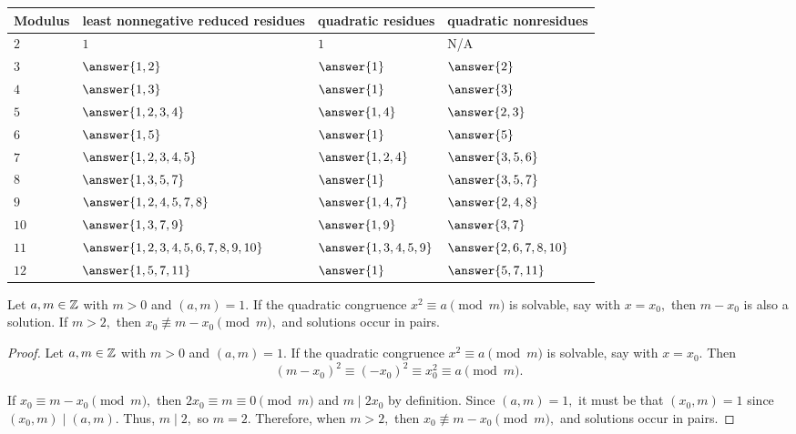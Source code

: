 \documentclass[letterpaper, 11 pt]{ximera}
\theoremstyle{definition}
\begin{document}
\begin{br}
\begin{solution}
        \begin{tabular}{p{1.5cm}|p{4cm}p{3cm}p{3cm}}
            Modulus & least nonnegative reduced residues & quadratic residues & quadratic nonresidues \\\hline
            $2$ & $1$   
                & $1$ 
                & N/A \\
            $3$ & $\answer{1,2}$ 
                & $\answer{1}$
                & $\answer{2}$\\
            $4$ & $\answer{1,3}$ 
                & $\answer{1}$
                & $\answer{3}$\\
            $5$ & $\answer{1,2,3,4}$
                & $\answer{1,4}$
                & $\answer{2,3}$\\
            $6$ & $\answer{1,5}$
                & $\answer{1}$
                & $\answer{5}$\\
            $7$ & $\answer{1,2,3,4,5}$
                & $\answer{1,2,4}$
                & $\answer{3,5,6}$\\
            $8$ & $\answer{1,3,5,7}$
                & $\answer{1}$
                & $\answer{3,5,7}$\\
            $9$ & $\answer{1,2,4,5,7,8}$
                & $\answer{1,4,7}$
                & $\answer{2,4,8}$\\
            $10$ & $\answer{1,3,7,9}$
                & $\answer{1,9}$
                & $\answer{3,7}$\\
            $11$ & $\answer{1,2,3,4,5,6,7,8,9,10}$
                & $\answer{1,3,4,5,9}$
                & $\answer{2,6,7,8,10}$\\
            $12$ & $\answer{1,5,7,11}$
                & $\answer{1}$
                & $\answer{5,7,11}$\\
        \end{tabular}
    \end{solution}
\end{br}

\begin{lem*}\label{lem:roots-pairs}
    Let $a,m\in\mathbb Z$ with $m>0$ and $(a,m)=1.$ If the quadratic congruence $x^2\equiv a\pmod{m}$ is solvable, say with $x=x_0,$ then  $m-x_0$ is also a solution. If $m\gt 2,$ then $x_0\not\equiv m-x_0\pmod{m},$ and solutions occur in pairs.
\end{lem*}

\begin{proof}
    Let $a,m\in\mathbb Z$ with $m>0$ and $(a,m)=1.$ If the quadratic congruence $x^2\equiv a\pmod{m}$ is solvable, say with $x=x_0.$ Then 
    \[(m-x_0)^2\equiv (-x_0)^2\equiv x_0^2\equiv a\pmod{m}.\]
    
    If $x_0\equiv m-x_0\pmod{m},$ then $2x_0\equiv m\equiv 0 \pmod{m}$ and $m\mid 2x_0$ by definition. Since $(a,m)=1,$ it must be that $(x_0,m)=1$ since $(x_0,m)\mid(a,m).$ Thus, $m\mid 2,$ so $m=2.$ Therefore, when  $m\gt 2,$ then $x_0\not\equiv m-x_0\pmod{m},$ and solutions occur in pairs.
\end{proof}
\end{document}
